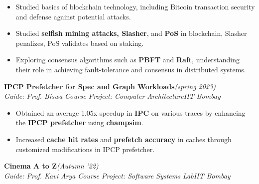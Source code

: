 \documentclass[10 pt]{article}
\begin{document}
		\begin{itemize}[itemsep = -0.8 mm, leftmargin=*]
		\vspace{-16pt}
		\item  Studied basics of blockchain technology, including Bitcoin transaction security and defense against potential attacks.
  \item Studied \textbf{selfish mining attacks, Slasher}, and \textbf{PoS} in blockchain, Slasher penalizes, PoS validates based on staking.
  \item Exploring consensus algorithms such as \textbf{PBFT} and \textbf{Raft}, understanding their role in achieving fault-tolerance and consensus in distributed systems.
	\end{itemize}
 	{\selectfont
		\textbf{{IPCP Prefetcher for Spec and Graph Workloads}}\hfill{\sl \small (spring 2023)}\\
	}{\it Guide: Prof. Biswa \textbar} {\it Course Project:  Computer Architecture}\hfill{\sl \small IIT Bombay}\\
	\begin{itemize}[itemsep = -0.8 mm, leftmargin=*]
		\vspace{-16pt}
		\item Obtained an average 1.05x speedup in \textbf{IPC} on various traces by enhancing the \textbf{IPCP prefetcher} using \textbf{champsim}.
		\item Increased \textbf{cache hit rates} and \textbf{prefetch accuracy} in caches through customized modifications in IPCP prefetcher.
	\end{itemize}
{\selectfont
		\textbf{{Cinema A to Z}}\hfill{\sl \small (Autumn '22)}\\
	}{\it Guide: Prof. Kavi Arya \textbar} {\it Course Project: Software Systems Lab}\hfill{\sl \small IIT Bombay}\\
\end{document}
